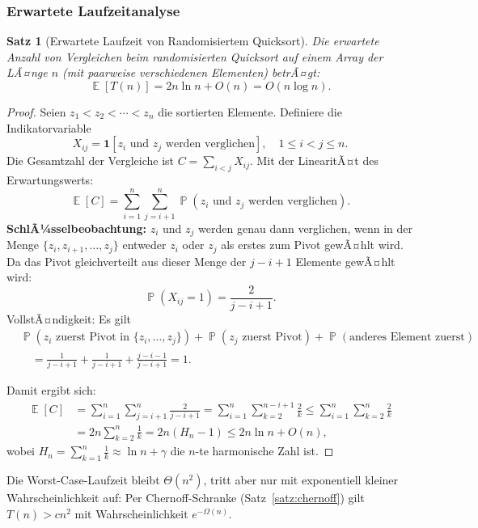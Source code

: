 ﻿\documentclass[12pt,a4paper]{article}
\theoremstyle{definition}
\theoremstyle{plain}
\newtheorem{satz}{Satz}[section]
\theoremstyle{remark}
\DeclareMathOperator{\E}{\mathbb{E}}
\DeclareMathOperator{\Prob}{\mathbb{P}}
\begin{document}
\subsubsection{Erwartete Laufzeitanalyse}

\begin{satz}[Erwartete Laufzeit von Randomisiertem Quicksort]\label{satz:ewrqs}
  Die erwartete Anzahl von Vergleichen beim randomisierten Quicksort
  auf einem Array der LÃ¤nge $n$ (mit paarweise verschiedenen Elementen)
  betrÃ¤gt:
  \[
    \E[T(n)] = 2n\ln n + O(n) = O(n \log n).
  \]
\end{satz}

\begin{proof}
  Seien $z_1 < z_2 < \cdots < z_n$ die sortierten Elemente. Definiere die
  Indikatorvariable
  \[
    X_{ij} = \mathbf{1}[\text{$z_i$ und $z_j$ werden verglichen}],
    \quad 1 \leq i < j \leq n.
  \]
  Die Gesamtzahl der Vergleiche ist $C = \sum_{i<j} X_{ij}$.
  Mit der LinearitÃ¤t des Erwartungswerts:
  \[
    \E[C] = \sum_{i=1}^{n}\sum_{j=i+1}^{n} \Prob(z_i \text{ und } z_j \text{ werden verglichen}).
  \]
  \textbf{SchlÃ¼sselbeobachtung:} $z_i$ und $z_j$ werden genau dann verglichen,
  wenn in der Menge $\{z_i, z_{i+1}, \ldots, z_j\}$ entweder $z_i$ oder
  $z_j$ als erstes zum Pivot gewÃ¤hlt wird. Da das Pivot gleichverteilt aus
  dieser Menge der $j-i+1$ Elemente gewÃ¤hlt wird:
  \[
    \Prob(X_{ij} = 1) = \frac{2}{j - i + 1}.
  \]
  VollstÃ¤ndigkeit: Es gilt
  \begin{align*}
    &\Prob(\text{$z_i$ zuerst Pivot in $\{z_i,\ldots,z_j\}$})
    + \Prob(\text{$z_j$ zuerst Pivot})
    + \Prob(\text{anderes Element zuerst}) \\
    &\quad= \frac{1}{j{-}i{+}1} + \frac{1}{j{-}i{+}1} + \frac{j{-}i{-}1}{j{-}i{+}1} = 1.
  \end{align*}

  Damit ergibt sich:
  \begin{align*}
    \E[C] &= \sum_{i=1}^{n}\sum_{j=i+1}^{n} \frac{2}{j-i+1}
    = \sum_{i=1}^{n}\sum_{k=2}^{n-i+1} \frac{2}{k}
    \leq \sum_{i=1}^{n}\sum_{k=2}^{n} \frac{2}{k} \\
    &= 2n \sum_{k=2}^{n} \frac{1}{k} = 2n\left(H_n - 1\right)
    \leq 2n \ln n + O(n),
  \end{align*}
  wobei $H_n = \sum_{k=1}^n \frac{1}{k} \approx \ln n + \gamma$ die $n$-te
  harmonische Zahl ist.
\end{proof}

Die Worst-Case-Laufzeit bleibt $\Theta(n^2)$, tritt aber nur mit exponentiell
kleiner Wahrscheinlichkeit auf: Per Chernoff-Schranke (Satz~\ref{satz:chernoff})
gilt $T(n) > cn^2$ mit Wahrscheinlichkeit $e^{-\Omega(n)}$.
\end{document}
